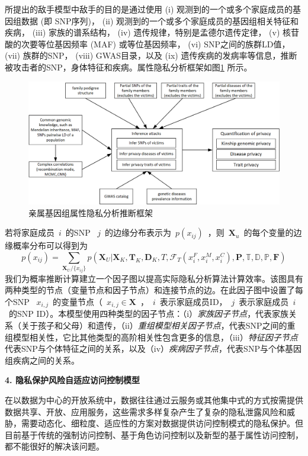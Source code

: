 \documentclass[pdftex,notypeinfo,twoside,openany,UTF8,fntef]{CASthesis}
\theoremstyle{THrm}{
	\newtheorem{question}{Question}[section]
	\newtheorem{property}{性质}[section]
	\newtheorem{assumption}{假设}[section]
	\newtheorem{claim}[lemma]{断言}
	
}
\begin{document}
所提出的敌手模型中敌手的目的是通过使用 (i) 观测到的一个或多个家庭成员的基因组数据 (即 SNP序列)，  (ii) 观测到的一个或多个家庭成员的基因组相关特征和疾病， (iii) 家族的谱系结构， (iv) 遗传规律，特别是孟德尔遗传定律， (v) 核苷酸的次要等位基因频率 (MAF) 或等位基因频率， (vi) SNP之间的族群LD值， (vii) 族群的SNP， (viii) GWAS目录，以及 (ix) 遗传疾病的发病率等信息，推断被攻击者的SNP，身体特征和疾病。属性隐私分析框架如图\ref{fig:attack-framework} 所示。
\begin{figure}[htbp]
	\centering
	\includegraphics[width=0.95\linewidth]{./figures/attack-framework.png}
	\centering
	\caption{亲属基因组属性隐私分析推断框架}\label{fig:attack-framework}
\end{figure}

若将家庭成员~$i$~的SNP ~$j$~的边缘分布表示为~$p(x_{ij})$~，则~$\mathbf{X}_u$~的每个变量的边缘概率分布可以得到为
\begin{equation}
p(x_{ij})= \sum_{\mathbf{X}_U/\{x_{ij}\}} p(\mathbf{X}_U | \mathbf{X}_K, \mathbf{T}_K, \mathbf{D}_K, T,  \mathcal{F}_T(x_i^F,x_i^M,x_i^C), \mathbf{P}, \mathbb{T}, \mathbb{D}, \mathbb{P}, \mathbf{F})
\end{equation}
我们为概率推断计算建立一个因子图以提高实际隐私分析算法计算效率。该图具有两种类型的节点（变量节点和因子节点）和连接节点的边。在此因子图中设置了每个SNP ~$x_{i,j}$~的变量节点（~$x_{i,j}\in \mathbf{X}$~，~$i$~表示家庭成员ID，~$j$~表示家庭成员~$i$~的SNP ID）。本模型使用四种类型的因子节点：（i）\emph{家族因子节点}，代表家族关系（关于孩子和父母）和遗传，（ii）\emph{重组模型相关因子节点}，代表SNP之间的重组模型相关性，它比其他类型的高阶相关性包含更多的信息，（iii）\emph{特征因子节点}代表SNP与个体特征之间的关系，以及（iv）\emph{疾病因子节点}，代表SNP与个体基因组疾病之间的关系。

\textbf{4.	隐私保护风险自适应访问控制模型}

在以数据为中心的开放系统中，数据往往通过云服务或其他集中式的方式按需提供数据共享、开放、应用服务，这些需求多样复杂产生了复杂的隐私泄露风险和威胁，需要动态化、细粒度、适应性的方案对数据提供访问控制模式的隐私保护。但目前基于传统的强制访问控制、基于角色访问控制以及新型的基于属性访问控制，都不能很好的解决该问题。
\end{document}
